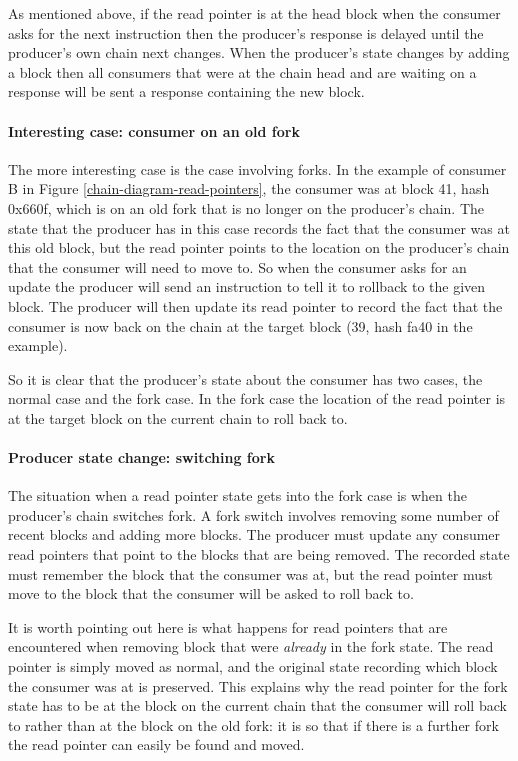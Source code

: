 \documentclass{article}
\theoremstyle{definition}{
  \newtheorem{lemma}{Lemma}[section] %
  \newtheorem{definition}[lemma]{Definition}
}
\theoremstyle{theorem}{
  \newtheorem{invariant}[lemma]{Invariant}
  \newtheorem{proofobligation}[lemma]{Proof Obligation}
}
\numberwithin{equation}{lemma}
\begin{document}
As mentioned above, if the read pointer is at the head block when the consumer
asks for the next instruction then the producer's response is delayed until
the producer's own chain next changes. When the producer's state changes by
adding a block then all consumers that were at the chain head and are waiting
on a response will be sent a response containing the new block.

\paragraph{Interesting case: consumer on an old fork}
The more interesting case is the case involving forks. In the example of
consumer B in Figure \ref{chain-diagram-read-pointers}, the consumer was at
block 41, hash 0x660f, which is on an old fork that is no longer on the
producer's chain. The state that the producer has in this case records the fact
that the consumer was at this old block, but the read pointer points to the
location on the producer's chain that the consumer will need to move to. So
when the consumer asks for an update the producer will send an instruction to
tell it to rollback to the given block. The producer will then update its read
pointer to record the fact that the consumer is now back on the chain at the
target block (39, hash fa40 in the example).

So it is clear that the producer's state about the consumer has two cases, the
normal case and the fork case. In the fork case the location of the read
pointer is at the target block on the current chain to roll back to.

\paragraph{Producer state change: switching fork}

The situation when a read pointer state gets into the fork case is when the
producer's chain switches fork. A fork switch involves removing some number
of recent blocks and adding more blocks. The producer must update any consumer
read pointers that point to the blocks that are being removed. The recorded
state must remember the block that the consumer was at, but the read pointer
must move to the block that the consumer will be asked to roll back to.

It is worth pointing out here is what happens for read pointers that are
encountered when removing block that were \emph{already} in the fork state.
The read pointer is simply moved as normal, and the original state recording
which block the consumer was at is preserved. This explains why the read
pointer for the fork state has to be at the block on the current chain that the
consumer will roll back to rather than at the block on the old fork: it is so
that if there is a further fork the read pointer can easily be found and moved.
\end{document}
